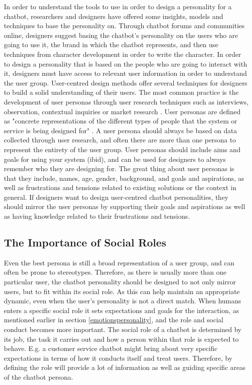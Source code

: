 In order to understand the tools to use in order to design a personality for a chatbot, researchers and designers have offered some insights, models and techniques to base the personality on. Through chatbot forums and communities online, designers suggest basing the chatbot's personality on the users who are going to use it, the brand in which the chatbot represents, and then use techniques from character development in order to write the character. In order to design a personality that is based on the people who are going to interact with it, designers must have access to relevant user information in order to understand the user group. User-centred design methods offer several techniques for designers to build a solid understanding of their users. The most common practice is the development of user personas through user research techniques such as interviews, observation, contextual inquiries or market research \citep{Courage2015}. User personas are defined as "concrete representations of the different types of people that the system or service is being designed for" \citep[: 55]{Benyon2014}. A user persona should always be based on data collected through user research, and often there are more than one persona to represent the entirety of the user group. User personas should include aims and goals for using your system (ibid), and can be used for designers to always remember who they are designing for. The great thing about user personas is that they include, names, age, gender, background, and goals and aspirations, as well as frustrations and tensions related to existing solutions or the context in general. If designers want to design user-centred chatbot personalities, they should mirror the user personas by supporting their goals and aspirations as well as having knowledge related to their frustrations and tensions.

\vspace{2,5mm}

\subsection{The Importance of Social Roles}
Even the best persona is still a broad representation of a user group, and can often be prone to stereotypes. Therefore, as there is usually more than one particular user, the chatbot personality should be designed to not only mirror users, but to fit within its social role. As this can help maintain an appropriate dynamic, even when the user's personality is not a direct match. When humans enters a specific social role it sets expectations and goals for the interaction, as mentioned earlier in section \ref{emotionspersonality}, and the role and social conduct becomes more important. The social role of a chatbot is determined by its job, the task it carries out and how a person within that role is expected to behave. E.g. a customer service chatbot might bring about very specific expectations in terms of how it conducts itself and treat users. Therefore, by defining the role will provide a lot of information as well as guiding specific areas of the chatbot persona.

